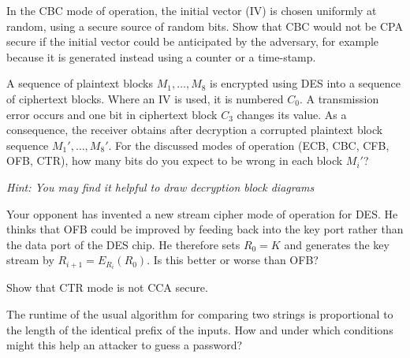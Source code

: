 \documentclass{supervision}
\begin{document}
  \begin{questions}
    \question In the CBC mode of operation, the initial vector (IV) is chosen
      uniformly at random, using a secure source of random bits. Show that CBC
      would not be CPA secure if the initial vector could be anticipated by the
      adversary, for example because it is generated instead using a counter or
      a time-stamp.

    \question A sequence of plaintext blocks $M_1, \ldots , M_8$ is encrypted
      using DES into a sequence of ciphertext blocks. Where an IV is used, it
      is numbered $C_0$. A transmission error occurs and one bit in ciphertext
      block $C_3$ changes its value. As a consequence, the receiver obtains
      after decryption a corrupted plaintext block sequence $M_1', \ldots ,
      M_8'$. For the discussed modes of operation (ECB, CBC, CFB, OFB, CTR),
      how many bits do you expect to be wrong in each block $M_i'$?

      \textit{Hint: You may find it helpful to draw decryption block diagrams}

    \question Your opponent has invented a new stream cipher mode of operation
      for DES. He thinks that OFB could be improved by feeding back into the
      key port rather than the data port of the DES chip. He therefore sets
      $R_0 = K$ and generates the key stream by $R_{i+1} = E_{R_i}(R_0)$. Is
      this better or worse than OFB?

    \question Show that CTR mode is not CCA secure.

    \question The runtime of the usual algorithm for comparing two strings is
      proportional to the length of the identical prefix of the inputs. How and
      under which conditions might this help an attacker to guess a password?

    \question
\end{questions}
\end{document}
